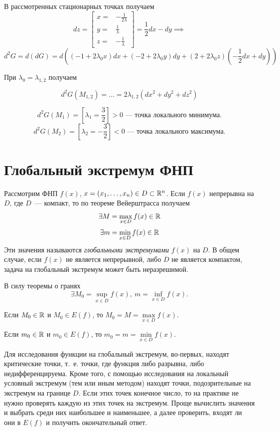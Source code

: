 \documentclass[../../main.tex]{subfiles}
\begin{document}
\begin{exmp}
	В рассмотренных стационарных точках получаем
	\[ dz = \left[
	\begin{array}{rl}
	x =& -\frac{1}{2\lambda} \\
	y =& \frac{1}{\lambda} \\
	z =& -\frac{1}{\lambda}
	\end{array}
	\right] = \frac{1}{2}dx - dy \implies\] 
	\[d^2G = d\left(dG\right) = 
	d\left(\left(-1 + 2\lambda_0x\right)dx + \left(-2 
	+ 2\lambda_0y\right)dy 
	+ \left(2 + 2\lambda_0z\right)\left(-\frac{1}{2}dx + dy\right)\right) \]
	
	При $\lambda_0 = \lambda_{1, 2}$ получаем
	
	\[d^2G(M_{1, 2}) = \dots = 2\lambda_{1, 2}(dx^2 + dy^2 + dz^2)\]
	
	\[d^2G(M_1) = \left[\lambda_1 = \frac{3}{2}\right] > 0
	\text{~--- точка локального минимума.}\]
	\[d^2G(M_2) = \left[\lambda_2 = -\frac{3}{2}\right] < 0
	\text{~--- точка локального максимума.}\]
	\end{exmp}
	
	\section{Глобальный экстремум ФНП}
	
	Рассмотрим ФНП $f(x)$, $x = (x_1, \dots, 
	x_n) \in D \subset \mathbb{R}^n$. Если $f(x)$ непрерывна на $D$,
	где $D$~--- компакт, то по теореме Вейерштрасса получаем
	\[ \exists M = \max\limits_{x \in D} f(x) \in \mathbb{R} \] 
	\[ \exists m = \min\limits_{x \in D} f(x) \in \mathbb{R} \]
	Эти значения называются \emph{глобальными экстремумами} $f(x)$ на $D$.
	В общем случае, если $f(x)$ не является непрерывной, либо $D$ 
	не является компактом, задача на глобальный экстремум может быть неразрешимой.
	
	В силу теоремы о гранях
	\[ \exists M_0 = \sup\limits_{x \in D} f(x),\
	m = \inf\limits_{x \in D} f(x). \]
	
	Если $M_0 \in \mathbb{R}$ и $M_0 \in E(f)$, то $M_0 = M = 
	\max\limits_{x \in D} f(x)$.
	
	Если $m_0 \in \mathbb{R}$ и $m_0 \in E(f)$, то $m_0 = m = 
	\min\limits_{x \in D} f(x)$.
	
	Для исследования функции на глобальный экстремум, во-первых, 
	находят критические точки, т.~е. точки, 
	где функция либо разрывна, либо недифференцируема. Кроме того, с помощью 
	исследования на локальный условный экстремум (тем или иным методом)
	находят точки, подозрительные на экстремум на границе $D$.
	Если этих точек конечное число, то на практике не нужно проверять каждую из 
	этих точек на экстремум.
	Проще вычислить значения и выбрать среди них наибольшее и наименьшее, 
	а далее проверить, входят ли они в $E(f)$ и 
	получить окончательный ответ.
	
\end{document}
